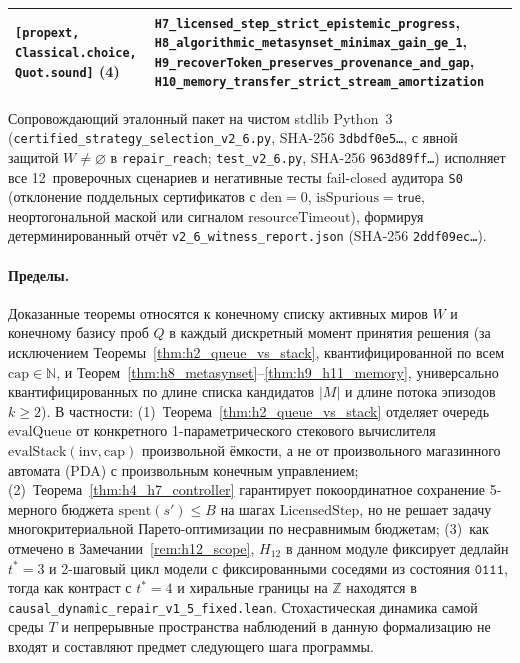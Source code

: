 \documentclass[11pt,a4paper]{article}
\theoremstyle{cleanthm}
\theoremstyle{cleandef}
\begin{document}
\begin{table}[!htbp]
\begin{tabularx}{\linewidth}{@{}l >{\raggedright\arraybackslash}X@{}}
\texttt{[propext, Classical.choice, Quot.sound]} (4) & \texttt{H7\_licensed\_\allowbreak step\_\allowbreak strict\_\allowbreak epistemic\_\allowbreak progress}, \texttt{H8\_algorithmic\_\allowbreak metasynset\_\allowbreak minimax\_\allowbreak gain\_\allowbreak ge\_1}, \texttt{H9\_recoverToken\_\allowbreak preserves\_\allowbreak provenance\_\allowbreak and\_\allowbreak gap}, \texttt{H10\_memory\_\allowbreak transfer\_\allowbreak strict\_\allowbreak stream\_\allowbreak amortization} \\
\bottomrule
\end{tabularx}
\end{table}

Сопровождающий эталонный пакет на чистом stdlib Python~3 (\texttt{certified\_\allowbreak strategy\_\allowbreak selection\_\allowbreak v2\_6.py}, SHA-256 \texttt{3dbdf0e5\ldots}, с явной защитой $W\neq\varnothing$ в \texttt{repair\_reach}; \texttt{test\_v2\_6.py}, SHA-256 \texttt{963d89ff\ldots}) исполняет все 12~проверочных сценариев и негативные тесты fail-closed аудитора \texttt{S0} (отклонение поддельных сертификатов с $\mathrm{den}=0$, $\mathrm{isSpurious}=\mathsf{true}$, неортогональной маской или сигналом $\mathrm{resourceTimeout}$), формируя детерминированный отчёт \texttt{v2\_6\_witness\_report.json} (SHA-256 \texttt{2ddf09ec\ldots}).

\paragraph{Пределы.}
Доказанные теоремы относятся к конечному списку активных миров $W$ и конечному базису проб $Q$ в каждый дискретный момент принятия решения (за исключением Теоремы~\ref{thm:h2_queue_vs_stack}, квантифицированной по всем $\mathrm{cap}\in\mathbb{N}$, и Теорем~\ref{thm:h8_metasynset}--\ref{thm:h9_h11_memory}, универсально квантифицированных по длине списка кандидатов $|M|$ и длине потока эпизодов $k\ge 2$). В частности: (1)~Теорема~\ref{thm:h2_queue_vs_stack} отделяет очередь $\mathrm{evalQueue}$ от конкретного 1-параметрического стекового вычислителя $\mathrm{evalStack}(\mathrm{inv},\mathrm{cap})$ произвольной ёмкости, а не от произвольного магазинного автомата (PDA) с произвольным конечным управлением; (2)~Теорема~\ref{thm:h4_h7_controller} гарантирует покоординатное сохранение 5-мерного бюджета $\mathrm{spent}(s')\le B$ на шагах $\mathrm{LicensedStep}$, но не решает задачу многокритериальной Парето-оптимизации по несравнимым бюджетам; (3)~как отмечено в Замечании~\ref{rem:h12_scope}, $H_{12}$ в данном модуле фиксирует дедлайн $t^*=3$ и 2-шаговый цикл модели с фиксированными соседями из состояния $\mathtt{0111}$, тогда как контраст с $t^*=4$ и хиральные границы на $\mathbb{Z}$ находятся в \texttt{causal\_dynamic\_repair\_v1\_5\_fixed.lean}. Стохастическая динамика самой среды $T$ и непрерывные пространства наблюдений в данную формализацию не входят и составляют предмет следующего шага программы.
\end{document}
